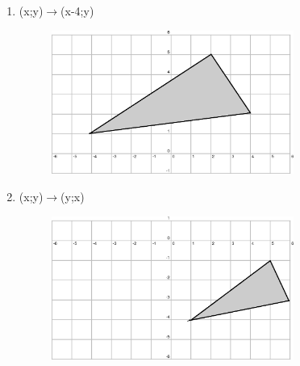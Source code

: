 \begin{enumerate}[noitemsep, label=\textbf{\arabic*}. ]
\begin{enumerate}[noitemsep, label=\textbf{\alph*}. ]
\begin{figure}[H]
\begin{center}
      \vspace{2pt}
    \vspace{.1in}
    
    \end{center}

 \end{figure}   

    \addtocounter{footnote}{-0}
    \label{m39358*uid127}\item  (x;y)\begin{math}\to \end{math}(x-4;y)

    \setcounter{subfigure}{0}


	\begin{figure}[H] %
    \begin{center}
    \label{m39358*id74022!!!underscore!!!media}\label{m39358*id74022!!!underscore!!!printimage}\includegraphics[width=300px]{col11306.imgs/m39358_MG10C14_038.png} %
        
      \vspace{2pt}
    \vspace{.1in}
    
    \end{center}

 \end{figure}   

    \addtocounter{footnote}{-0}
    \label{m39358*uid128}\item (x;y)\begin{math}\to \end{math}(y;x)

    \setcounter{subfigure}{0}


	\begin{figure}[H] %
    \begin{center}
    \label{m39358*id74053!!!underscore!!!media}\label{m39358*id74053!!!underscore!!!printimage}\includegraphics[width=300px]{col11306.imgs/m39358_MG10C14_039.png} %
        

\end{center}
\end{figure}
\end{enumerate}
\end{enumerate}
